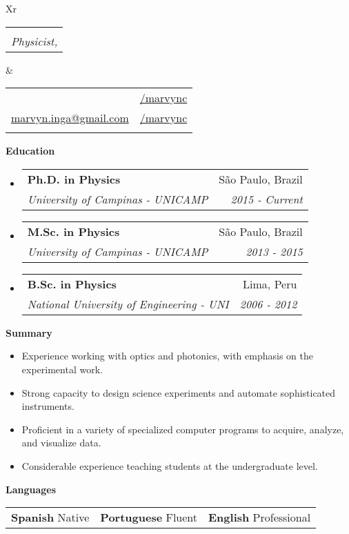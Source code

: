 \documentclass[letterpaper, 12pt]{article}[leftmargin=*]
\makeatletter
\def \fullname {\Huge Marvyn Inga}
\def \subtitle {Physicist, \faMale}
\def \linkedinicon {\faLinkedin}
\def \linkedinlink {https://www.linkedin.com/in/marvync/}
\def \linkedintext {/marvync}
\def \phoneicon {\faPhone}
\def \phonetext {+55-21-975106507}
\def \emailicon {\faEnvelope}
\def \emaillink {mailto:marvyn.inga@gmail.com}
\def \emailtext {marvyn.inga@gmail.com}
\def \githubicon {\faGithub}
\def \githublink {https://github.com/marvync}
\def \githubtext {/marvync}
\def \headertype {\doublecol} %
\def \linkedin {\linkedinicon \hspace{3pt}\href{\linkedinlink}{\linkedintext}}
\def \phone {\phoneicon \hspace{3pt}{ \phonetext}}
\def \email {\emailicon \hspace{3pt}\href{\emaillink}{\emailtext}}
\def \github {\githubicon \hspace{3pt}\href{\githublink}{\githubtext}}
\renewcommand{\section}[2]{
  \colorbox{secondary}{\color{white}\raggedbottom\normalsize\textbf{{#1}{\hspace{7pt}#2}}}
}
\newcommand{\resumeEntryStart}{\begin{itemize}[leftmargin=2.5mm]\itemsep8pt}
\newcommand{\resumeEntryEnd}{\end{itemize}}
\newcommand{\resumeItemListStart}{\begin{itemize}[leftmargin=4.5mm]\itemsep-3pt}
\newcommand{\resumeItemListEnd}{\end{itemize}}
\newcommand{\resumeItem}[1]{
  \item\small{
    {#1}
  }
}
\newcommand{\resumeEntryTSDL}[4]{
  \item[]
    \begin{tabularx}{0.98\textwidth}{X@{\hspace{60pt}}r}
      \textbf{\color{primary}#1} & {\firabook\color{accent}\small#2} \\
      \vspace{-0.37cm}
      \textit{\color{accent}\small#3} & \textit{\color{accent}\small#4} \\
    \end{tabularx}\vspace{-0.37cm}
}
\newcommand{\resumeEntryS}[2]{
  \item[]\small{
    \textbf{\color{primary}#1 }{ #2 }
  }
}
\newcommand{\triplecol}[3]{
	\vspace{-0.3cm}
	\begin{tabularx}{\textwidth}{XXX}
	{\small#1} & {\small#2} & {\small#3}
	\end{tabularx}
}
\newcommand{\doublecol}[6]{
  \begin{tabularx}{\textwidth}{Xr}
    {
      \begin{tabular}[c]{l}
        \fontsize{35}{45}\selectfont{\color{primary}{{\textbf{\fullname}}}} \\
        {\textit{\subtitle}} %
      \end{tabular}
    } & {
      \begin{tabular}[c]{l@{\hspace{1.5em}}l}
        {\small#4} & {\small#1} \\
        {\small#5} & {\small#2} \\
        {\small#6} & {\small#3}
      \end{tabular}
    }
  \end{tabularx}
\vspace{0.3cm}
}
\newcommand{\singlecol}[6]{
  \begin{tabularx}{\textwidth}{Xr}
    {
      \begin{tabular}[b]{l}
        \fontsize{35}{45}\selectfont{\color{primary}{{\textbf{\fullname}}}} \\
        {\textit{\subtitle}} %
      \end{tabular}
    } & {
      \begin{tabular}[c]{l}
        {\small#1} \\
        {\small#2} \\
        {\small#3} \\
        {\small#4} \\
        {\small#5} \\
        {\small#6}
      \end{tabular}
    }
  \end{tabularx}
}
\makeatother
\begin{document}


\headertype{\linkedin}{\github}{}{\phone}{\email}{} %

\section{\faGraduationCap}{Education}

\resumeEntryStart
	\small
	\resumeEntryTSDL
    {Ph.D. in Physics}{São Paulo, Brazil}
	{\footnotesize University of Campinas - UNICAMP}{\footnotesize 2015 - Current}
	\resumeEntryTSDL
	{M.Sc. in Physics}{São Paulo, Brazil}
	{\footnotesize University of Campinas - UNICAMP}{\footnotesize 2013 - 2015}
	\resumeEntryTSDL
	{B.Sc. in Physics}{Lima, Peru}
	{\footnotesize National University of Engineering - UNI}{\footnotesize 2006 - 2012}
\resumeEntryEnd
\vspace{0.15cm}
\section{\faFolderOpen}{Summary}
\resumeItemListStart
\resumeItem {Experience working with optics and photonics, with emphasis on the experimental work.}
\resumeItem {Strong capacity to design science experiments and automate sophisticated instruments.}
\resumeItem {Proficient in a variety of specialized computer programs to acquire, analyze, and visualize data.}
\resumeItem {Considerable experience teaching students at the undergraduate level.}
\resumeItemListEnd

\section{\faComment}{Languages}
\vspace{-0.2cm}
\resumeEntryStart
	\small
	\triplecol{\resumeEntryS{Spanish}{Native}}{\resumeEntryS{Portuguese}{Fluent}}{\resumeEntryS{English} {Professional}}
\resumeEntryEnd
\end{document}
